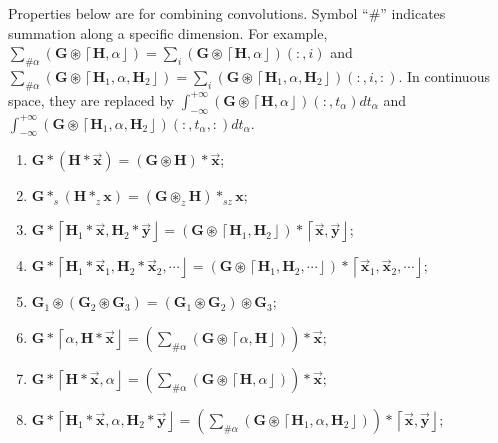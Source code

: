 \documentclass[twoside,11pt]{article}
\def\oconv{\circledast}
\def\dsmark{{\scriptstyle \#}}
\def\tvar#1{\mathbf{#1}} %
\def\vsymb#1{\vec{\mathbf{#1}}}
\def\intinf{\int_{-\infty}^{+\infty}\!}
\def\lcerfl#1{\left\lceil{#1}\right\rfloor}
\begin{document}
Properties below are for combining convolutions.
Symbol ``\(\dsmark\)'' indicates summation along a specific dimension.
For example, \(\sum_{\dsmark \alpha} \left(\tvar{G} \oconv \lcerfl{\tvar{H}, \alpha}\right) = \sum_i (\tvar{G} \oconv \lcerfl{\tvar{H}, \alpha})(:,i)\) and \(\sum_{\dsmark \alpha} \left(\tvar{G} \oconv \lcerfl{\tvar{H}_1, \alpha, \tvar{H}_2}\right) = \sum_i (\tvar{G} \oconv \lcerfl{\tvar{H}_1, \alpha, \tvar{H}_2})(:,i,:)\). In continuous space, they are replaced by \(\intinf \left(\tvar{G} \oconv \lcerfl{\tvar{H}, \alpha}\right)(:,t_{\alpha}) d t_{\alpha}\) and \(\intinf \left(\tvar{G} \oconv \lcerfl{\tvar{H}_1, \alpha, \tvar{H}_2}\right)(:, t_{\alpha}, :) d t_{\alpha}\).

\begin{enumerate}[resume]
  \item \label{prop:conv-g-conv-h-x} %
        \(\tvar{G} * (\tvar{H} * \vsymb{x}) = (\tvar{G} \oconv \tvar{H}) * \vsymb{x}\);
  \item \label{prop:conv-stride-s-g-conv-stride-z-h-x}
        \(\tvar{G} *_s (\tvar{H} *_z \tvar{x}) = (\tvar{G} \oconv_z \tvar{H}) *_{sz} \tvar{x}\);
  \item \label{prop:conv-g-mul-conv-h1-x-conv-h2-y} %
        \(\tvar{G} * \lcerfl{\tvar{H}_1 * \vsymb{x}, \tvar{H}_2 * \vsymb{y}} = (\tvar{G} \oconv \lcerfl{\tvar{H}_1, \tvar{H}_2}) * \lcerfl{\vsymb{x}, \vsymb{y}}\);
  \item \label{prop:conv-g-prod-n-conv-h-x} %
        \(\tvar{G} * \lcerfl{\tvar{H}_1 * \vsymb{x}_1, \tvar{H}_2 * \vsymb{x}_2, \cdots} = (\tvar{G} \oconv \lcerfl{\tvar{H}_1, \tvar{H}_2, \cdots}) * \lcerfl{\vsymb{x}_1, \vsymb{x}_2, \cdots}\);
  \item \label{prop:oconv-g1-oconv-g2-g3} %
        \(\tvar{G}_1 \oconv (\tvar{G}_2 \oconv \tvar{G}_3) = (\tvar{G}_1 \oconv \tvar{G}_2) \oconv \tvar{G}_3\);
  \item \label{prop:conv-g-conv-alpha-conv-h-x} %
        \(\tvar{G} * \lcerfl{\alpha, \tvar{H} * \vsymb{x}} = \left(\sum_{\dsmark \alpha} \left(\tvar{G} \oconv \lcerfl{\alpha, \tvar{H}}\right) \right) * \vsymb{x}\);
  \item \label{prop:conv-g-conv-h-conv-alpha-x}%
        \(\tvar{G} * \lcerfl{\tvar{H} * \vsymb{x}, \alpha} = \left(\sum_{\dsmark \alpha} \left(\tvar{G} \oconv \lcerfl{\tvar{H}, \alpha}\right) \right) * \vsymb{x}\);
  \item \label{prop:conv-g-conv-conv-h1-x-alpha-conv-h2-y} %
        \(\tvar{G} * \lcerfl{\tvar{H}_1 * \vsymb{x}, \alpha, \tvar{H}_2 * \vsymb{y}}
        = \left(\sum_{\dsmark \alpha} \left(\tvar{G} \oconv \lcerfl{\tvar{H}_1, \alpha, \tvar{H}_2}\right) \right) * \lcerfl{\vsymb{x}, \vsymb{y}}\);
\end{enumerate}
\end{document}
